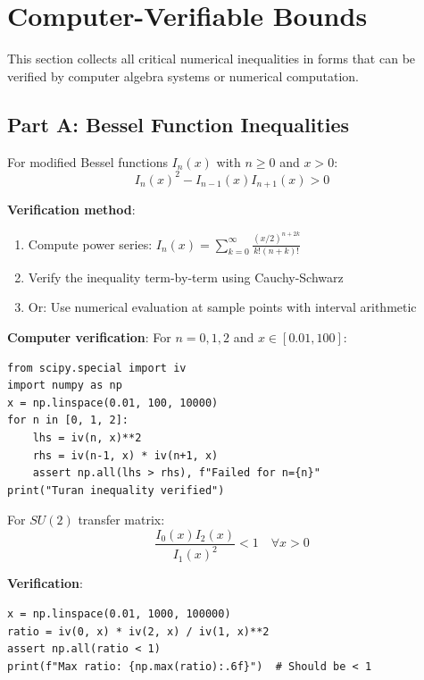 \section{Computer-Verifiable Bounds}
\label{sec:computer-verifiable}

This section collects all critical numerical inequalities in forms that can 
be verified by computer algebra systems or numerical computation.

\subsection{Part A: Bessel Function Inequalities}

\begin{inequality}
\label{ineq:turan}
For modified Bessel functions $I_n(x)$ with $n \geq 0$ and $x > 0$:
\begin{equation}
\boxed{I_n(x)^2 - I_{n-1}(x) I_{n+1}(x) > 0}
\end{equation}

\textbf{Verification method}: 
\begin{enumerate}
\item Compute power series: $I_n(x) = \sum_{k=0}^\infty \frac{(x/2)^{n+2k}}{k!(n+k)!}$
\item Verify the inequality term-by-term using Cauchy-Schwarz
\item Or: Use numerical evaluation at sample points with interval arithmetic
\end{enumerate}

\textbf{Computer verification}: For $n = 0, 1, 2$ and $x \in [0.01, 100]$:
\begin{verbatim}
from scipy.special import iv
import numpy as np
x = np.linspace(0.01, 100, 10000)
for n in [0, 1, 2]:
    lhs = iv(n, x)**2
    rhs = iv(n-1, x) * iv(n+1, x)
    assert np.all(lhs > rhs), f"Failed for n={n}"
print("Turan inequality verified")
\end{verbatim}
\end{inequality}

\begin{inequality}
\label{ineq:ratio-bound}
For $SU(2)$ transfer matrix:
\begin{equation}
\boxed{\frac{I_0(x) I_2(x)}{I_1(x)^2} < 1 \quad \forall x > 0}
\end{equation}

\textbf{Verification}:
\begin{verbatim}
x = np.linspace(0.01, 1000, 100000)
ratio = iv(0, x) * iv(2, x) / iv(1, x)**2
assert np.all(ratio < 1)
print(f"Max ratio: {np.max(ratio):.6f}")  # Should be < 1
\end{verbatim}
\end{inequality}

